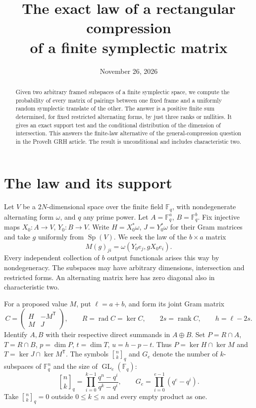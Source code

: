 \documentclass[10pt]{article}
\title{The exact law of a rectangular compression\\of a finite symplectic matrix}
\author{}
\date{November 26, 2026}
\DeclareMathOperator{\radic}{rad}
\DeclareMathOperator{\rk}{rank}
\DeclareMathOperator{\Sp}{Sp}
\DeclareMathOperator{\GL}{GL}
\newcommand{\F}{\mathbb F_q}
\newcommand{\gb}[2]{\genfrac{[}{]}{0pt}{}{#1}{#2}_{q}}
\begin{document}
\maketitle
\begin{abstract}
Given two arbitrary framed subspaces of a finite symplectic space, we compute the probability of every matrix of pairings between one fixed frame and a uniformly random symplectic translate of the other. The answer is a positive finite sum determined, for fixed restricted alternating forms, by just three ranks or nullities. It gives an exact support test and the conditional distribution of the dimension of intersection. This answers the finite-law alternative of the general-compression question in the ProveIt GRH article. The result is unconditional and includes characteristic two.
\end{abstract}
\section{The law and its support}

Let $V$ be a $2N$-dimensional space over the finite field $\F$, with nondegenerate alternating form $\omega$, and $q$ any prime power. Let $A=\F^a$, $B=\F^b$. Fix injective maps $X_0:A\to V$, $Y_0:B\to V$. Write $H=X_0^*\omega$, $J=Y_0^*\omega$ for their Gram matrices and take $g$ uniformly from $\Sp(V)$. We seek the law of the $b\times a$ matrix
\[
 M(g)_{ji}=\omega(Y_0 e_j,gX_0 e_i).
\]
Every independent collection of $b$ output functionals arises this way by nondegeneracy. The subspaces may have arbitrary dimensions, intersection and restricted forms. An alternating matrix here has zero diagonal also in characteristic two.

For a proposed value $M$, put $\ell=a+b$, and form its joint Gram matrix
\[
 C=\begin{pmatrix}H&-M^{\mathsf T}\\ M&J\end{pmatrix},\qquad
 R=\radic C=\ker C,\qquad 2s=\rk C,\qquad h=\ell-2s .
\]
Identify $A,B$ with their respective direct summands in $A\oplus B$. Set $P=R\cap A$, $T=R\cap B$, $p=\dim P$, $t=\dim T$, $u=h-p-t$. Thus $P=\ker H\cap\ker M$ and $T=\ker J\cap\ker M^{\mathsf T}$. The symbols $\gb{n}{k}$ and $G_e$ denote the number of $k$-subspaces of $\F^n$ and the size of $\GL_e(\F)$:
\[
 \gb{n}{k}=\prod_{i=0}^{k-1}\frac{q^n-q^i}{q^k-q^i},
 \qquad G_e=\prod_{i=0}^{e-1}(q^e-q^i).
\]
Take $\gb{n}{k}=0$ outside $0\le k\le n$ and every empty product as one.
\end{document}
